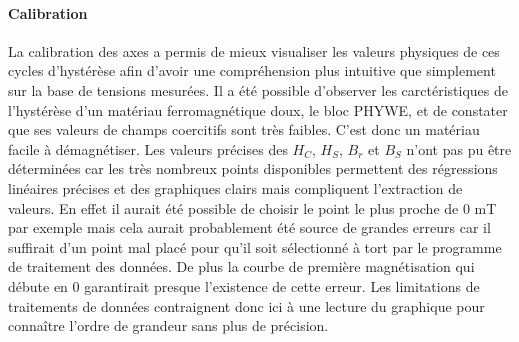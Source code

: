 \paragraph*{Calibration}
La calibration des axes a permis de mieux visualiser les valeurs physiques de ces cycles d'hystérèse afin d'avoir une compréhension plus intuitive que simplement sur la base de tensions mesurées. Il a été possible d'observer les carctéristiques de l'hystérèse d'un matériau ferromagnétique doux, le bloc PHYWE, et de constater que ses valeurs de champs coercitifs sont très faibles. C'est donc un matériau facile à démagnétiser. Les valeurs précises des \(H_C\), \(H_S\), \(B_r\) et \(B_S\) n'ont pas pu être déterminées car les très nombreux points disponibles permettent des régressions linéaires précises et des graphiques clairs mais compliquent l'extraction de valeurs. En effet il aurait été possible de choisir le point le plus proche de 0 \si{\milli\tesla} par exemple mais cela aurait probablement été source de grandes erreurs car il suffirait d'un point mal placé pour qu'il soit sélectionné à tort par le programme de traitement des données. De plus la courbe de première magnétisation qui débute en 0 garantirait presque l'existence de cette erreur. Les limitations de traitements de données contraignent donc ici à une lecture du graphique pour connaître l'ordre de grandeur sans plus de précision.